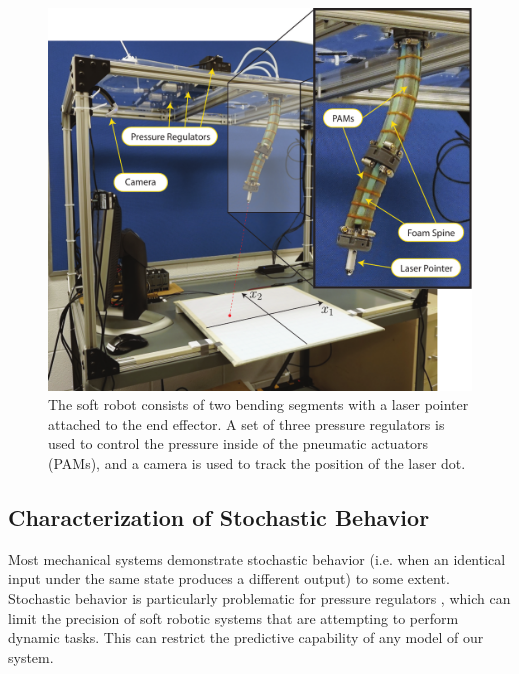 \begin{figure}
    \centering
    \includegraphics[width=\linewidth]{figures/rig_N_robot_smaller.pdf}
    \caption{The soft robot consists of two bending segments with a laser pointer attached to the end effector. A set of three pressure regulators is used to control the pressure inside of the pneumatic actuators (PAMs), and a camera is used to track the position of the laser dot.}
    \label{fig:rig}
    \vspace*{-0.5cm}
\end{figure}

\subsection{Characterization of Stochastic Behavior}
\label{sec:noise}

Most mechanical systems demonstrate stochastic behavior (i.e. when an identical input under the same state produces a different output) to some extent.
Stochastic behavior is particularly problematic for pressure regulators , which can limit the precision of soft robotic systems that are attempting to perform dynamic tasks.
This can restrict the predictive capability of any model of our system.

